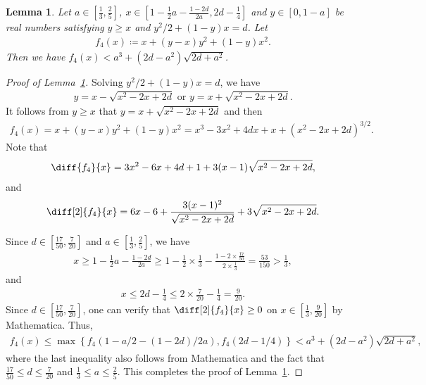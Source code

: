 \documentclass[11pt,a4paper]{article}
\newtheorem{lemma}[definition]{Lemma}
\begin{document}
\begin{appendix}
\begin{lemma}\label{Lem:calculation_5}
Let $ a \in \left[\tfrac{1}{3},\tfrac{2}{5}\right]$, $x\in \left[1- \tfrac{1}{2}a -\tfrac{1-2d}{2a},2d - \tfrac{1}{4}\right]$ and $y \in \left[0,1-a\right]$ be real numbers satisfying $y \ge x$ and $y^2/2 + (1-y)x = d$. 
Let 
\begin{align*}
f_4(x) \coloneqq x+(y-x)y^2+(1-y)x^2. 
\end{align*}
Then we have $f_4(x) < a^3+(2d-a^2) \sqrt{2d+a^2}$. 
\end{lemma}

\begin{proof}[Proof of Lemma~\ref{Lem:calculation_5}]
Solving $y^2/2 + (1-y)x = d$, we have 
\begin{align*}
y = x- \sqrt{x^2-2x+2d} \text{~or~} y = x+ \sqrt{x^2-2x+2d}. 
\end{align*}
It follows from $y \ge x$ that $y= x+ \sqrt{x^2-2x+2d}$ and then 
\begin{align*}
f_4(x) 
= x+(y-x)y^2+(1-y)x^2 
= x^3-3x^2+4dx+x+\left(x^2-2x+2d\right)^{3/2}.  
\end{align*}
Note that 
\begin{align*}
\diff{f_4}{x}
= 3x^2-6x +4d+1+3(x-1) \sqrt{x^2-2x+2d},
\end{align*}
and 
\begin{align*}
\diff[2]{f_4}{x}
= 6x-6+ \frac{3(x-1)^2}{\sqrt{x^2-2x+2d}}+3\sqrt{x^2-2x+2d}. 
\end{align*}

Since $d \in \left[\tfrac{17}{50}, \tfrac{7}{20}\right]$ and $a \in \left[\tfrac{1}{3},\tfrac{2}{5}\right]$, we have 
\begin{align*}
x 
\ge 1- \frac{1}{2}a -\frac{1-2d}{2a} 
\ge 1- \frac{1}{2} \times \frac{1}{3} -\frac{1-2\times \frac{17}{50}}{2\times \frac{1}{3}}
= \frac{53}{150}
> \frac{1}{3}, 
\end{align*}
and 
\begin{align*}
x
\le 2d - \frac{1}{4}
\le 2 \times \frac{7}{20} - \frac{1}{4}
= \frac{9}{20}. 
\end{align*}
Since $d \in \left[\tfrac{17}{50}, \tfrac{7}{20}\right]$, one can verify that $\diff[2]{f_4}{x} \ge 0$ on $x \in \left[\tfrac{1}{3},\tfrac{9}{20}\right]$ by Mathematica. 
Thus, 
\begin{align*}
f_4(x) 
\le \max \left\{f_4(1-a/2-(1-2d)/2a),f_4(2d-1/4)\right\} 
< a^3+\left(2d - a^2\right)\sqrt{2d+a^2}, 
\end{align*}
where the last inequality also follows from Mathematica and the fact that $\tfrac{17}{50} \le d \le \tfrac{7}{20}$ and $\tfrac{1}{3} \le a \le \tfrac{2}{5}$. 
This completes the proof of Lemma~\ref{Lem:calculation_5}. 
\end{proof}

\end{appendix}
\end{document}
